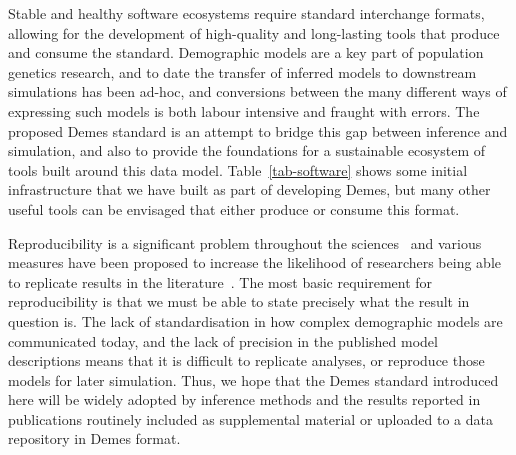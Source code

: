 \documentclass[11pt]{article}
\begin{document}
Stable and healthy software ecosystems require standard interchange
formats, allowing for the development of high-quality and long-lasting
tools that produce and consume the standard.
Demographic models are a key part of population genetics research,
and to date the transfer of inferred models to downstream simulations
has been ad-hoc, and conversions between the many different ways
of expressing such models is both labour intensive and fraught with errors.
The proposed Demes standard is an attempt to bridge this gap
between inference and simulation, and also to provide the foundations
for a sustainable ecosystem of tools built around this data model.
Table~\ref{tab-software} shows some initial infrastructure that we have
built as part of developing Demes, but many other useful tools
can be envisaged that either produce or consume this format.

Reproducibility is a significant problem throughout the
sciences~\citep{baker20161} and various measures have been
proposed to increase the likelihood of researchers being
able to replicate results in the
literature~\citep{munafo2017manifesto}. The most basic requirement
for reproducibility is that we must be able to state precisely what
the result in question is. The lack of standardisation in how
complex demographic models are communicated today, and the lack of
precision in the published model descriptions means that it is difficult
to replicate analyses, or reproduce those models for later simulation.
Thus, we hope that the Demes standard introduced here will be widely adopted
by inference methods and the results reported in publications
routinely included as supplemental material or uploaded to a data
repository in Demes format.



\end{document}
